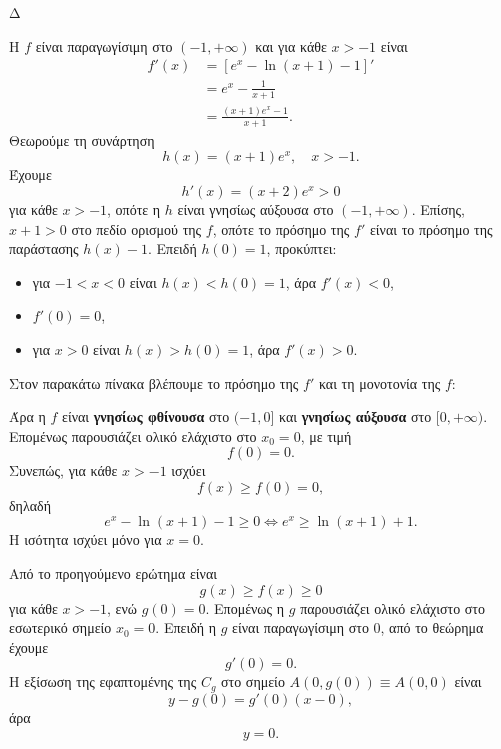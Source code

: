 \begin{thema}{Δ}
\begin{erwthma}
\item Η $f$ είναι παραγωγίσιμη στο $(-1,+\infty)$ και για κάθε $x>-1$ είναι
\begin{align*}
f'(x)
&=\left[e^x-\ln(x+1)-1\right]'\\
&=e^x-\frac{1}{x+1}\\
&=\frac{(x+1)e^x-1}{x+1}.
\end{align*}
Θεωρούμε τη συνάρτηση
\[
h(x)=(x+1)e^x,\quad x>-1.
\]
Έχουμε
\[
h'(x)=(x+2)e^x>0
\]
για κάθε $x>-1$, οπότε η $h$ είναι γνησίως αύξουσα στο $(-1,+\infty)$. Επίσης, $x+1>0$ στο πεδίο ορισμού της $f$, οπότε το πρόσημο της $f'$ είναι το πρόσημο της παράστασης $h(x)-1$. Επειδή $h(0)=1$, προκύπτει:
\begin{itemize}
\item για $-1<x<0$ είναι $h(x)<h(0)=1$, άρα $f'(x)<0$,
\item $f'(0)=0$,
\item για $x>0$ είναι $h(x)>h(0)=1$, άρα $f'(x)>0$.
\end{itemize}
Στον παρακάτω πίνακα βλέπουμε το πρόσημο της $f'$ και τη μονοτονία της $f$:
\begin{center}
\end{center}

Άρα η $f$ είναι \textbf{γνησίως φθίνουσα} στο $(-1,0]$ και \textbf{γνησίως αύξουσα} στο $[0,+\infty)$. Επομένως παρουσιάζει ολικό ελάχιστο στο $x_0=0$, με τιμή
\[
{f(0)=0}.
\]
Συνεπώς, για κάθε $x>-1$ ισχύει
\[
f(x)\geq f(0)=0,
\]
δηλαδή
\[
e^x-\ln(x+1)-1\geq0
\Leftrightarrow
{e^x\geq\ln(x+1)+1}.
\]
Η ισότητα ισχύει μόνο για $x=0$.

\item Από το προηγούμενο ερώτημα είναι
\[
g(x)\geq f(x)\geq0
\]
για κάθε $x>-1$, ενώ $g(0)=0$. Επομένως η $g$ παρουσιάζει ολικό ελάχιστο στο εσωτερικό σημείο $x_0=0$. Επειδή η $g$ είναι παραγωγίσιμη στο $0$, από το θεώρημα  έχουμε
\[
{g'(0)=0}.
\]
Η εξίσωση της εφαπτομένης της $C_g$ στο σημείο $A(0,g(0))\equiv A(0,0)$ είναι
\[
y-g(0)=g'(0)(x-0),
\]
άρα
\[
{y=0}.
\]


\end{erwthma}
\end{thema}
